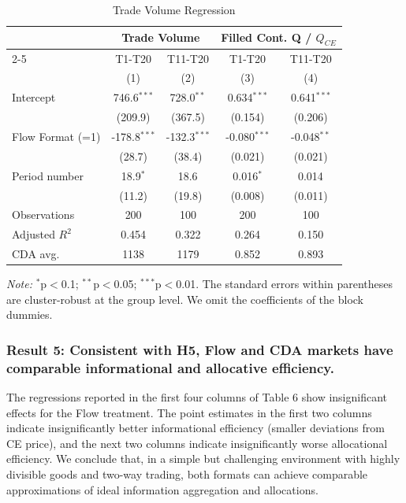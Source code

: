 \documentclass[12pt]{article}
\begin{document}
\begin{table}
\centering    
\caption{Trade Volume Regression}
\begin{threeparttable}
\begin{tabular}{@{\extracolsep{5pt}}lcccc}
\toprule
& \multicolumn{2}{c}{Trade Volume} & \multicolumn{2}{c}{Filled Cont. Q / $Q_{CE}$} \\
\cmidrule{2-5}
& T1-T20 & T11-T20 & T1-T20 & T11-T20 \\
& (1) & (2) & (3) & (4) \\
\midrule
Intercept & 746.6$^{***}$ & 728.0$^{**}$ & 0.634$^{***}$ & 0.641$^{***}$ \\
  & (209.9) & (367.5) & (0.154) & (0.206) \\
Flow Format (=1) & -178.8$^{***}$ & -132.3$^{***}$ & -0.080$^{***}$ & -0.048$^{**}$ \\
  & (28.7) & (38.4) & (0.021) & (0.021) \\
Period number & 18.9$^{*}$ & 18.6$^{}$ & 0.016$^{*}$ & 0.014$^{}$ \\
  & (11.2) & (19.8) & (0.008) & (0.011) \\
\midrule
Observations & 200 & 100 & 200 & 100 \\
Adjusted $R^2$ & 0.454 & 0.322 & 0.264 & 0.150 \\
\midrule
CDA avg. & 1138 & 1179 & 0.852 & 0.893 \\
\bottomrule
\end{tabular}
\begin{tablenotes}[para]
\footnotesize
\textit{Note:} $^{*}$p$<$0.1; $^{**}$p$<$0.05; $^{***}$p$<$0.01. The standard errors within parentheses are cluster-robust at the group level. We omit the coefficients of the block dummies. 
\end{tablenotes}
\end{threeparttable}
\label{tab:Volume}
\end{table}

\subsubsection*{Result 5: Consistent with H5, Flow and CDA markets have comparable  informational and allocative efficiency.}

The regressions reported in the first four columns of Table 6 show insignificant effects for the Flow treatment. The point estimates in the first two columns indicate insignificantly better informational efficiency (smaller deviations from CE price), and the next two columns indicate insignificantly worse allocational efficiency. 
We conclude that, in a simple but challenging environment with highly divisible goods and two-way trading, both formats can achieve comparable approximations of ideal information aggregation and allocations.
\end{document}
